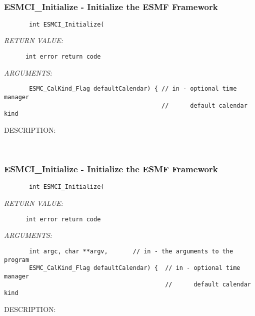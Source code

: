   
 
\mbox{}\hrulefill\ 
 
\subsubsection [ESMCI\_Initialize] {ESMCI\_Initialize - Initialize the ESMF Framework}


  
\begin{verbatim}       int ESMCI_Initialize(\end{verbatim}{\em RETURN VALUE:}
\begin{verbatim}      int error return code\end{verbatim}{\em ARGUMENTS:}
\begin{verbatim}       ESMC_CalKind_Flag defaultCalendar) { // in - optional time manager
                                            //      default calendar kind\end{verbatim}
{\sf DESCRIPTION:\\ }


   
 
\mbox{}\hrulefill\ 
 
\subsubsection [ESMCI\_Initialize] {ESMCI\_Initialize - Initialize the ESMF Framework}


  
\begin{verbatim}       int ESMCI_Initialize(\end{verbatim}{\em RETURN VALUE:}
\begin{verbatim}      int error return code\end{verbatim}{\em ARGUMENTS:}
\begin{verbatim}       int argc, char **argv,       // in - the arguments to the program
       ESMC_CalKind_Flag defaultCalendar) {  // in - optional time manager
                                             //      default calendar kind\end{verbatim}
{\sf DESCRIPTION:\\ }


   
 
